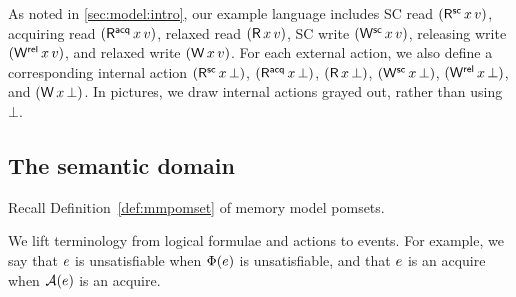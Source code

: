 As noted in \textsection\ref{sec:model:intro}, our example language includes
SC read $(\DRSC{\aLoc}{\aVal})$, acquiring
read $(\DRAcq{\aLoc}{\aVal})$, relaxed read $(\DR{\aLoc}{\aVal})$, SC write
$(\DWSC{\aLoc}{\aVal})$, releasing
write $(\DWRel{\aLoc}{\aVal})$, and relaxed write $(\DW{\aLoc}{\aVal})$.
For each external action, we also define a corresponding internal action
$(\iDRSC{\aLoc}{\aVal})$,
$(\iDRAcq{\aLoc}{\aVal})$,
$(\iDR{\aLoc}{\aVal})$,
$(\iDWSC{\aLoc}{\aVal})$,
$(\iDWRel{\aLoc}{\aVal})$, and
$(\iDW{\aLoc}{\aVal})$.
In pictures, we draw internal actions grayed out,
rather than using $\bot$.  %





\subsection{The semantic domain}
\label{sec:sets}
Recall Definition~\ref{def:mmpomset} of memory model pomsets.

We lift terminology from logical formulae and actions to events. For example,
we say that $e$ is unsatisfiable when $\Phi(e)$ is unsatisfiable,
and that $e$ is an acquire when $\mathcal{A}(e)$ is an acquire.


